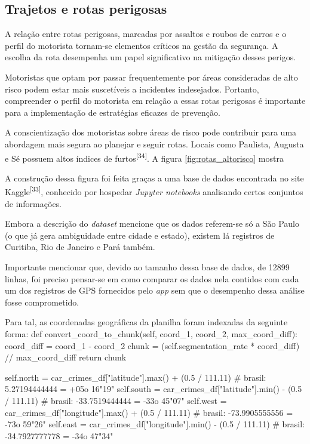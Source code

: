 \subsection{Trajetos e rotas perigosas}

A relação entre rotas perigosas, marcadas por assaltos e roubos de carros e o perfil do motorista tornam-se elementos críticos na gestão da segurança. A escolha da rota desempenha um papel significativo na mitigação desses perigos. 

Motoristas que optam por passar frequentemente por áreas consideradas de alto risco podem estar mais suscetíveis a incidentes indesejados. Portanto, compreender o perfil do motorista em relação a essas rotas perigosas é importante para a implementação de estratégias eficazes de prevenção. 

A conscientização dos motoristas sobre áreas de risco pode contribuir para uma abordagem mais segura ao planejar e seguir rotas.
Locais como Paulista, Augusta e Sé possuem altos índices de furtos\textsuperscript{[34]}. A figura \ref{fig:rotas_altorisco} mostra

A construção dessa figura foi feita graças a uma base de dados encontrada no site Kaggle\textsuperscript{[33]}, conhecido por hospedar \textit{Jupyter notebooks} analisando certos conjuntos de informações.

Embora a descrição do \textit{dataset} mencione que os dados referem-se só a São Paulo (o que já gera ambiguidade entre cidade e estado), existem lá registros de Curitiba, Rio de Janeiro e Pará também.

Importante mencionar que, devido ao tamanho dessa base de dados, de 12899 linhas, foi preciso pensar-se em como comparar os dados nela contidos com cada um dos registros de GPS fornecidos pelo \textit{app} sem que o desempenho dessa análise fosse comprometido.

Para tal, as coordenadas geográficas da planilha foram indexadas da seguinte forma: 
	def convert_coord_to_chunk(self, coord_1, coord_2, max_coord_diff):
		coord_diff = coord_1 - coord_2
		chunk = (self.segmentation_rate * coord_diff) // max_coord_diff
		return chunk

  		self.north = car_crimes_df["latitude"].max() + (0.5 / 111.11) # brasil: 5.27194444444  =	+05o 16"19"
		self.south = car_crimes_df["latitude"].min() - (0.5 / 111.11) # brasil: -33.7519444444 =	-33o 45"07"
		self.west = car_crimes_df["longitude"].max() + (0.5 / 111.11) # brasil: -73.9905555556 = 	-73o 59"26"
		self.east = car_crimes_df["longitude"].min() - (0.5 / 111.11) # brasil: -34.7927777778 =	-34o 47"34"


